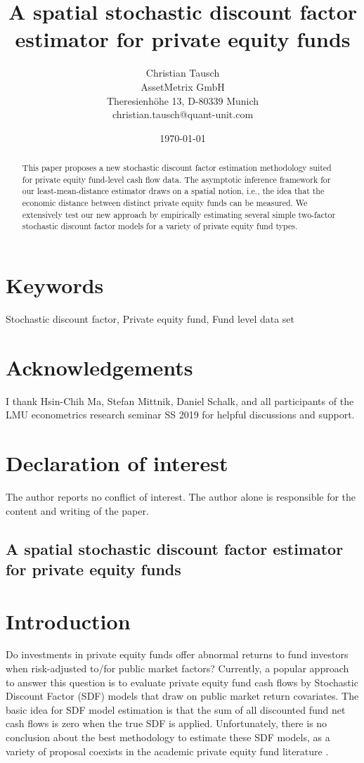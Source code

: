 \documentclass[12pt]{article}
\title{A spatial stochastic discount factor estimator for private equity funds}
\author{
	Christian Tausch  \\
	AssetMetrix GmbH  \\
	Theresienh\"{o}he 13, D-80339 Munich \\
	christian.tausch@quant-unit.com \\
	}
\date{\today}
\begin{document}
\maketitle


\section*{Keywords}
Stochastic discount factor, Private equity fund, Fund level data set


\section*{Acknowledgements}
I thank Hsin-Chih Ma, Stefan Mittnik, Daniel Schalk, and all participants of the LMU econometrics research seminar SS 2019 for helpful discussions and support.


\section*{Declaration of interest}
The author reports no conflict of interest. 
The author alone is responsible for the content and writing of the paper.


\newpage

\begin{center} 
\section*{A spatial stochastic discount factor estimator for private equity funds}
\end{center}



\begin{abstract}
This paper proposes a new stochastic discount factor estimation methodology suited for private equity fund-level cash flow data.
The asymptotic inference framework for our least-mean-distance estimator draws on a spatial notion, i.e., the idea that the economic distance between distinct private equity funds can be measured.
We extensively test our new approach by empirically estimating several simple two-factor stochastic discount factor models for a variety of private equity fund types.
\end{abstract}

\section{Introduction}
Do investments in private equity funds offer abnormal returns to fund investors when risk-adjusted to/for public market factors?
Currently, a popular approach to answer this question is to evaluate private equity fund cash flows by Stochastic Discount Factor (SDF) models that draw on public market return covariates.
The basic idea for SDF model estimation is that the sum of all discounted fund net cash flows is zero when the true SDF is applied.
Unfortunately, there is no conclusion about the best methodology to estimate these SDF models, as a variety of proposal coexists in the academic private equity fund literature \citep{DLP12,KN16,ACGP18,GSW19}.
\end{document}
